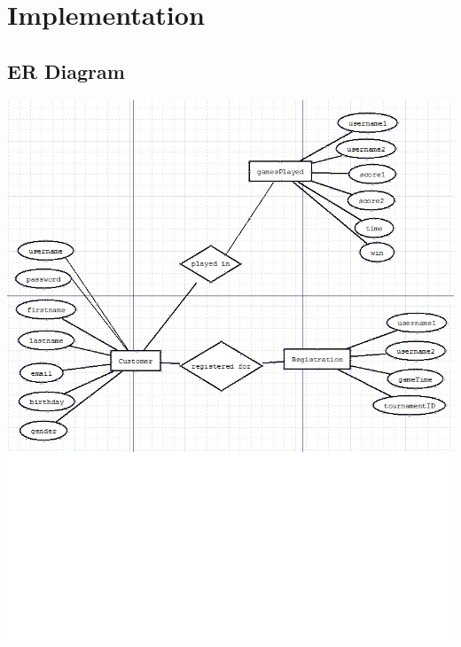%

\section{Implementation}
	
	
	
	
	\subsection{ER Diagram}
		\includegraphics[width=1.0\textwidth]{./ER.jpg}
	
	

\newpage